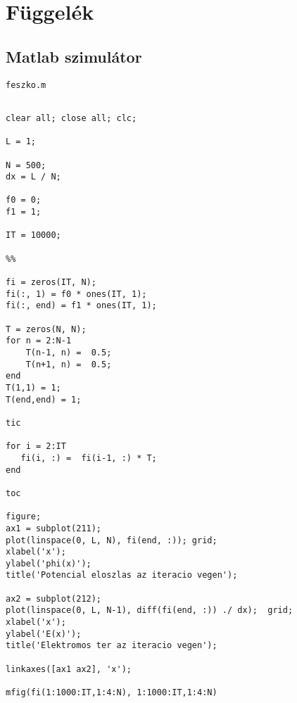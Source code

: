 
\chapter{Függelék}


\section{Matlab szimulátor}
\texttt{feszko.m }
\begin{lstlisting}[frame=single]  % Start your code-block

clear all; close all; clc;

L = 1;

N = 500;
dx = L / N;

f0 = 0;
f1 = 1;

IT = 10000;

%%

fi = zeros(IT, N);
fi(:, 1) = f0 * ones(IT, 1);
fi(:, end) = f1 * ones(IT, 1);

T = zeros(N, N);
for n = 2:N-1
    T(n-1, n) =  0.5;
    T(n+1, n) =  0.5;
end
T(1,1) = 1;
T(end,end) = 1;

tic

for i = 2:IT
   fi(i, :) =  fi(i-1, :) * T;
end

toc

figure;
ax1 = subplot(211);
plot(linspace(0, L, N), fi(end, :)); grid;
xlabel('x');
ylabel('phi(x)');
title('Potencial eloszlas az iteracio vegen');

ax2 = subplot(212);
plot(linspace(0, L, N-1), diff(fi(end, :)) ./ dx);  grid;
xlabel('x');
ylabel('E(x)');
title('Elektromos ter az iteracio vegen');

linkaxes([ax1 ax2], 'x');

mfig(fi(1:1000:IT,1:4:N), 1:1000:IT,1:4:N)
\end{lstlisting}

